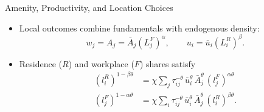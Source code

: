 \documentclass[11pt,aspectratio=169]{beamer}
\begin{document}
\begin{frame}{Amenity, Productivity, and Location Choices}
\begin{itemize}\small
  \item Local outcomes combine fundamentals with endogenous density:
  \vspace{-0.5em}\begin{equation}\label{eq:agglom}
    w_j = A_j = \bar A_j\left(L_j^F\right)^\alpha,
    \qquad
    u_i=\bar u_i\left(L_i^R\right)^\beta.
  \end{equation}
  \vspace{-0.4em}
  \item Residence ($R$) and workplace ($F$) shares satisfy
  \vspace{-0.2em}
  \begin{align}
  (l_i^R)^{1-\beta\theta} & = \chi \sum_j\tau_{ij}^{-\theta}\,\bar u_i^{\theta}\,\bar A_j^{\theta}\,(l_j^F)^{\alpha\theta} \label{eq:clear1} \\
  (l_j^F)^{1-\alpha\theta} & = \chi \sum_i\tau_{ij}^{-\theta}\,\bar u_i^{\theta}\,\bar A_j^{\theta}\,(l_i^R)^{\beta\theta}. \label{eq:clear2}
  \end{align}
  \vspace{-0.4em}
\end{itemize}
\end{frame}
\end{document}
